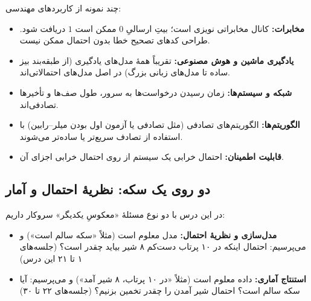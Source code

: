 چند نمونه از کاربردهای مهندسی:
\begin{itemize}
  \item \textbf{مخابرات:} کانال مخابراتی نویزی است؛ بیتِ ارسالیِ $0$ ممکن است $1$ دریافت شود. طراحی کدهای تصحیح خطا بدون احتمال ممکن نیست.
  \item \textbf{یادگیری ماشین و هوش مصنوعی:} تقریباً همهٔ مدل‌های یادگیری (از طبقه‌بند بیز ساده تا مدل‌های زبانی بزرگ) در اصل مدل‌های احتمالاتی‌اند.
  \item \textbf{شبکه و سیستم‌ها:} زمان رسیدن درخواست‌ها به سرور، طول صف‌ها و تأخیرها تصادفی‌اند.
  \item \textbf{الگوریتم‌ها:} الگوریتم‌های تصادفی (مثل  تصادفی یا آزمون اول بودن میلر--رابین) با استفاده از تصادف سریع‌تر یا ساده‌تر می‌شوند.
  \item \textbf{قابلیت اطمینان:} احتمال خرابی یک سیستم از روی احتمال خرابی اجزای آن.
\end{itemize}

\subsection{دو روی یک سکه: نظریهٔ احتمال و آمار}

در این درس با دو نوع مسئلهٔ «معکوسِ یکدیگر» سروکار داریم:

\begin{center}
\end{center}

\begin{itemize}
  \item \textbf{مدل‌سازی و نظریهٔ احتمال:} مدل معلوم است (مثلاً «سکه سالم است») و می‌پرسیم: احتمال اینکه در ۱۰ پرتاب دست‌کم ۸ شیر بیاید چقدر است؟ \quad (جلسه‌های ۱ تا ۲۱ این درس)
  \item \textbf{استنتاج آماری:} داده معلوم است (مثلاً «در ۱۰ پرتاب، ۸ شیر آمد») و می‌پرسیم: آیا سکه سالم است؟ احتمال شیر آمدن را چقدر تخمین بزنیم؟ \quad (جلسه‌های ۲۲ تا ۳۰)
\end{itemize}

